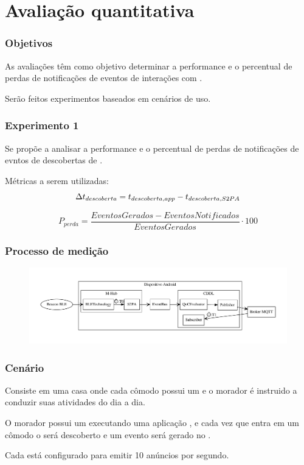 \documentclass[aspectratio=169]{beamer}
\begin{document}
\section{Avaliação quantitativa}


\begin{frame}
	\frametitle{Objetivos}
	As avaliações têm como objetivo determinar a performance e o percentual de perdas de notificações de eventos de interações com \smartobjs.

	\bigskip

	Serão feitos experimentos baseados em cenários de uso.
\end{frame}

\begin{frame}
	\frametitle{Experimento 1}
	Se propõe a analisar a performance e o percentual de perdas de notificações de evntos de descobertas de \smartobjs.

	\bigskip
	
	Métricas a serem utilizadas:
	\begin{equation}
		\label{equ:performance-discovery}
		\Delta t_{descoberta} = t_{descoberta,app} - t_{descoberta,S2PA}
	\end{equation}
	
	\begin{equation}
		\label{equ:acuracy}
		P_{perda} = \frac{EventosGerados - EventosNotificados}{EventosGerados} \cdot 100
	\end{equation}
\end{frame}

\begin{frame}
	\frametitle{Processo de medição}
	\begin{figure}
		\centering
		\includegraphics[width=.85\linewidth]{img/performance-annotation.pdf}
	\end{figure}
\end{frame}

\begin{frame}
	\frametitle{Cenário}
	Consiste em uma casa onde cada cômodo possui um \beacon \ble e o morador é instruido a conduzir suas atividades do dia a dia.

	\bigskip
	
	O morador possui um \smartphone executando uma aplicação \mhubcddl, e cada vez que entra em um cômodo o \beacon será descoberto e um evento será gerado no \stwopa.

	\bigskip
	
	Cada \beacon está configurado para emitir 10 anúncios por segundo.
\end{frame}
\end{document}
